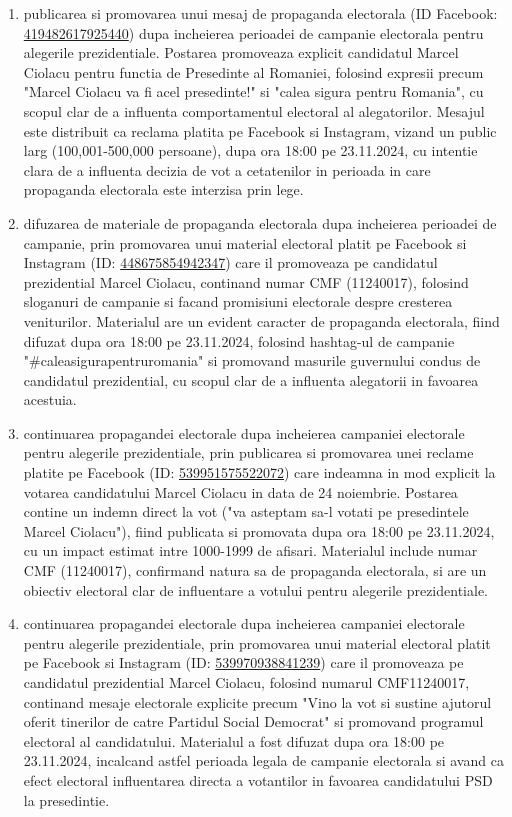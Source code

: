 \documentclass[a4paper,12pt]{article}
\begin{document}
\begin{enumerate}[leftmargin=*, label=\arabic*.)]
    \item publicarea si promovarea unui mesaj de propaganda electorala (ID Facebook: \href{https://www.facebook.com/ads/library/?id=419482617925440}{419482617925440}) dupa incheierea perioadei de campanie electorala pentru alegerile prezidentiale. Postarea promoveaza explicit candidatul Marcel Ciolacu pentru functia de Presedinte al Romaniei, folosind expresii precum "Marcel Ciolacu va fi acel presedinte!" si "calea sigura pentru Romania", cu scopul clar de a influenta comportamentul electoral al alegatorilor. Mesajul este distribuit ca reclama platita pe Facebook si Instagram, vizand un public larg (100,001-500,000 persoane), dupa ora 18:00 pe 23.11.2024, cu intentie clara de a influenta decizia de vot a cetatenilor in perioada in care propaganda electorala este interzisa prin lege.
    \item difuzarea de materiale de propaganda electorala dupa incheierea perioadei de campanie, prin promovarea unui material electoral platit pe Facebook si Instagram (ID: \href{https://www.facebook.com/ads/library/?id=448675854942347}{448675854942347}) care il promoveaza pe candidatul prezidential Marcel Ciolacu, continand numar CMF (11240017), folosind sloganuri de campanie si facand promisiuni electorale despre cresterea veniturilor. Materialul are un evident caracter de propaganda electorala, fiind difuzat dupa ora 18:00 pe 23.11.2024, folosind hashtag-ul de campanie "\#caleasigurapentruromania" si promovand masurile guvernului condus de candidatul prezidential, cu scopul clar de a influenta alegatorii in favoarea acestuia.
    \item continuarea propagandei electorale dupa incheierea campaniei electorale pentru alegerile prezidentiale, prin publicarea si promovarea unei reclame platite pe Facebook (ID: \href{https://www.facebook.com/ads/library/?id=539951575522072}{539951575522072}) care indeamna in mod explicit la votarea candidatului Marcel Ciolacu in data de 24 noiembrie. Postarea contine un indemn direct la vot ("va asteptam sa-l votati pe presedintele Marcel Ciolacu"), fiind publicata si promovata dupa ora 18:00 pe 23.11.2024, cu un impact estimat intre 1000-1999 de afisari. Materialul include numar CMF (11240017), confirmand natura sa de propaganda electorala, si are un obiectiv electoral clar de influentare a votului pentru alegerile prezidentiale.
    \item continuarea propagandei electorale dupa incheierea campaniei electorale pentru alegerile prezidentiale, prin promovarea unui material electoral platit pe Facebook si Instagram (ID: \href{https://www.facebook.com/ads/library/?id=539970938841239}{539970938841239}) care il promoveaza pe candidatul prezidential Marcel Ciolacu, folosind numarul CMF11240017, continand mesaje electorale explicite precum "Vino la vot si sustine ajutorul oferit tinerilor de catre Partidul Social Democrat" si promovand programul electoral al candidatului. Materialul a fost difuzat dupa ora 18:00 pe 23.11.2024, incalcand astfel perioada legala de campanie electorala si avand ca efect electoral influentarea directa a votantilor in favoarea candidatului PSD la presedintie.

\end{enumerate}
\end{document}
